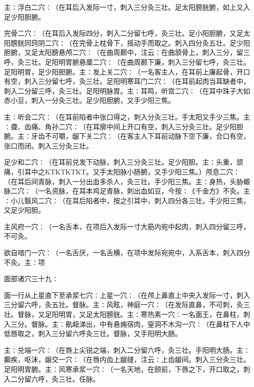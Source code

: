 \documentclass[a4paper,12pt,UTF8,twoside]{ctexbook}
\begin{document}
主∶浮白二穴∶（在耳后入发际一寸，刺入三分灸三壮。足太阳膀胱腑，如上又入足少阳胆腑。

完骨二穴∶（在耳后入发际四分，刺入二分留七呼，灸三壮。足小阳胆腑，又足太阳膀胱同窍阴二穴∶（在完骨上枕骨下，摇动手而取之。刺入四分灸五壮。足少阳胆腑，又足太阳膀悬颅二穴∶（在曲周颞中，注云∶在曲颔骨上，刺入三分，留三呼，灸三壮。足阳明胃腑悬厘二穴∶（在曲周颞下廉，刺入三分留七呼，灸三壮。足阳明胃，足少阳胆腑。主∶发上关二穴∶（一名客主人，在耳前上廉起骨，开口有空，刺入三分留七呼，灸三壮。足阳明寒耳门二穴∶（在耳前起肉当耳缺者中，刺入二分留三呼，灸三壮。足阳明脉胃。主∶耳鸣，听宫二穴∶（在耳中珠子大如赤小豆，刺入一分灸三壮。足少阳胆腑，又手少阳三焦。

主∶听会二穴∶（在耳前陷者中张口得之，刺入分灸三壮。手太阳又手少三焦。主∶聋、齿痛、角孙二穴∶（在耳廓中间上开口有空，刺入三分灸三壮。足少阳胆腑。主∶牙齿不可嚼，龈下关二穴∶（在客主人下耳前动脉下空下廉，合口有空，张口而闭。刺入三分灸三壮。

足少和二穴∶（在耳前兑发下动脉，刺入三分灸三壮。足少阳胆。主∶头重，颔痛，引耳中之KTKTKTKT。又手太阳脉小肠腑，又手少阳三焦。）颅息二穴∶（在耳后间青脉，刺入一分出血多杀人，灸三壮。手少阳三焦。主∶身热，头胁螈脉二穴∶（一名资脉，在耳本鸡足青脉，刺出血如豆，今按∶《千金方》不灸。主∶小儿翳风二穴∶（在耳后陷者中，按之引耳中，刺入四分各三壮。手少阳三焦，又足少阳胆。

主风府一穴∶（一名舌本，在项后入发际一寸大筋内宛中起肉，刺入四分留三呼，不可灸。

欲自喑门一穴∶（一名舌厌，一名舌横，在项中发际宛宛中，入系舌本，刺入四分不灸。主∶项

面部诸穴三十九∶

面一行从上星直下至承浆七穴∶上星一穴∶（在颅上鼻直上中央入发际一寸，刺入三分留六呼，灸五壮。督脉。主∶风眩，神庭一穴∶（在发际直鼻，不可刺，灸三壮。督脉，又足阳明胃，又足太阳膀胱。主∶寒热素一穴∶一名面王，在鼻柱，刺入三分。督脉。主∶鼽衄涕出，中有悬痈宿肉，窒洞不木沟一穴∶（在鼻柱下人中低唇取之，刺入三分留六呼灸三壮。督脉，又手阳明大肠。

主∶兑端一穴∶（在唇上尖锐之端，刺入二分留六呼，灸三壮。手阳明大肠。主∶癫疾，呕沫，龈交一穴∶（在唇内齿上龈缝，注云∶上齿龈间。刺入三分灸三壮。足阳明胃腑。主∶风寒承浆一穴∶（一名天地，在颐前，下唇之下，开口取之，刺入二分留六呼，灸三壮。任脉。
\end{document}

